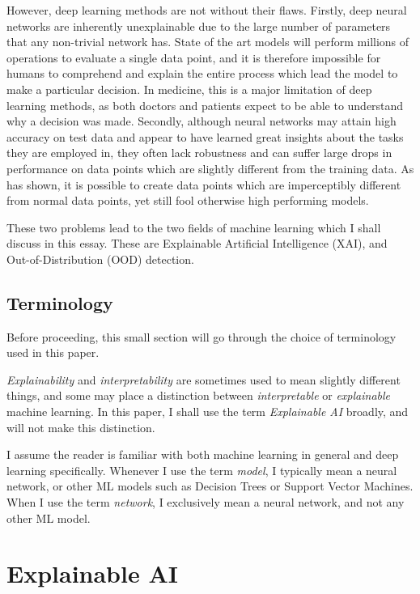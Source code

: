 \documentclass[conference]{IEEEtran}
\begin{document}

However, deep learning methods are not without their flaws. Firstly, deep neural networks are inherently unexplainable due to the large number of parameters that any non-trivial network has. State of the art models will perform millions of operations to evaluate a single data point, and it is therefore impossible for humans to comprehend and explain the entire process which lead the model to make a particular decision. In medicine, this is a major limitation of deep learning methods, as both doctors and patients expect to be able to understand why a decision was made. Secondly, although neural networks may attain high accuracy on test data and appear to have learned great insights about the tasks they are employed in, they often lack robustness and can suffer large drops in performance on data points which are slightly different from the training data. As \cite{intriguing} has shown, it is possible to create data points which are imperceptibly different from normal data points, yet still fool otherwise high performing models.

These two problems lead to the two fields of machine learning which I shall discuss in this essay. These are Explainable Artificial Intelligence (XAI), and Out-of-Distribution (OOD) detection.

\subsection{Terminology}

Before proceeding, this small section will go through the choice of terminology used in this paper.

{\it Explainability} and {\it interpretability} are sometimes used to mean slightly different things, and some may place a distinction between {\it interpretable} or {\it explainable} machine learning. In this paper, I shall use the term {\it Explainable AI} broadly, and will not make this distinction.

I assume the reader is familiar with both machine learning in general and deep learning specifically. Whenever I use the term {\it model}, I typically mean a neural network, or other ML models such as Decision Trees or Support Vector Machines. When I use the term {\it network}, I exclusively mean a neural network, and not any other ML model.

\section{Explainable AI} \label{xai_intro}
\end{document}
